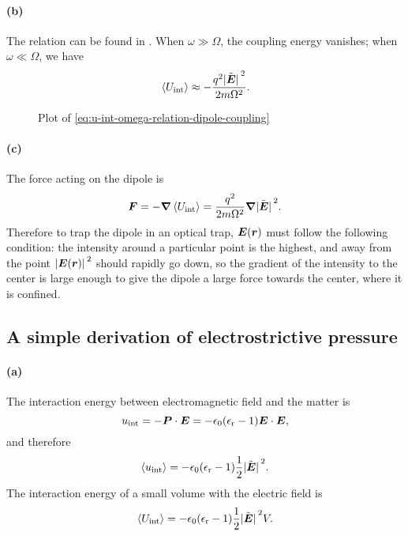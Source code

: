 \documentclass[hyperref, a4paper]{article}
\newcommand{\epsr}{\epsilon_{\text{r}}}
\begin{document}
\paragraph{(b)} The relation can be found in 
.
When $\omega \gg \Omega$, 
the coupling energy vanishes; 
when $\omega \ll \Omega$, we have 
\begin{equation}
    \expval*{U_{\text{int}}} \approx 
    - \frac{q^2 \abs*{\tilde{\vb*{E}}}^2}{2 m \Omega^2}.
\end{equation}

\begin{figure}
    \centering
    
    \caption{Plot of \eqref{eq:u-int-omega-relation-dipole-coupling}}
    \label{fig:u-int-omega-relation-dipole-coupling}
\end{figure}

\paragraph{(c)} The force acting on the dipole is
\begin{equation}
    \vb*{F} = - \grad{\expval*{U_{\text{int}}}}
    = \frac{q^2}{2 m \Omega^2} \grad{\abs*{\tilde{\vb*{E}}}^2}.
\end{equation}
Therefore to trap the dipole in an optical trap, 
$\vb*{E}(\vb*{r})$ must follow the following condition:
the intensity around a particular point is the highest, 
and away from the point $\abs*{\vb*{E}(\vb*{r})}^2$ 
should rapidly go down,
so the gradient of the intensity to the center is large enough 
to give the dipole a large force towards the center, 
where it is confined.

\subsection{A simple derivation of electrostrictive pressure}

\paragraph{(a)}
The interaction energy between electromagnetic field and the matter is 
\begin{equation}
    u_{\text{int}} = - \vb*{P} \cdot \vb*{E}
    = - \epsilon_0 (\epsr - 1) \vb*{E} \cdot \vb*{E},
\end{equation}
and therefore 
\begin{equation}
    \expval{u_{\text{int}}} = - \epsilon_0 (\epsr - 1) \frac{1}{2} \abs*{\tilde{\vb*{E}}}^2.
\end{equation}
The interaction energy of a small volume with the electric field is 
\begin{equation}
    \expval{U_{\text{int}}} = - \epsilon_0 (\epsr - 1) \frac{1}{2} \abs*{\tilde{\vb*{E}}}^2 V.
\end{equation}
\end{document}
